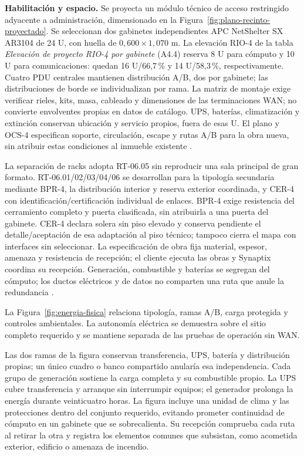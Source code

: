 \textbf{Habilitación y espacio.} Se proyecta un módulo técnico de acceso restringido adyacente a administración, dimensionado en la Figura~\ref{fig:plano-recinto-proyectado}. Se seleccionan dos gabinetes independientes APC NetShelter SX AR3104 de 24 U, con huella de $0,600\times1,070$ m. La elevación RIO-4 de la tabla \emph{Elevación de proyecto RIO-4 por gabinete} (A4.4) reserva 8 U para cómputo y 10 U para comunicaciones: quedan 16 U/66,7\,\% y 14 U/58,3\,\%, respectivamente. Cuatro PDU centrales mantienen distribución A/B, dos por gabinete; las distribuciones de borde se individualizan por rama. La matriz de montaje exige verificar rieles, kits, masa, cableado y dimensiones de las terminaciones WAN; no convierte envolventes propias en datos de catálogo. UPS, baterías, climatización y extinción conservan ubicación y servicio propios, fuera de esas U. El plano y OCS-4 especifican soporte, circulación, escape y rutas A/B para la obra nueva, sin atribuir estas condiciones al inmueble existente \parencite{p12-apc-ar3104}.





La separación de racks adopta RT-06.05 sin reproducir una sala principal de gran formato. RT-06.01/02/03/04/06 se desarrollan para la tipología secundaria mediante BPR-4, la distribución interior y reserva exterior coordinada, y CER-4 con identificación/certificación individual de enlaces. BPR-4 exige resistencia del cerramiento completo y puerta clasificada, sin atribuirla a una puerta del gabinete. CER-4 declara solera sin piso elevado y conserva pendiente el detalle/aceptación de esa adaptación al piso técnico; tampoco cierra el mapa con interfaces sin seleccionar. La especificación de obra fija material, espesor, amenaza y resistencia de recepción; el cliente ejecuta las obras y Synaptix coordina su recepción. Generación, combustible y baterías se segregan del cómputo; los ductos eléctricos y de datos no comparten una ruta que anule la redundancia \parencite[RT-06.01--06, pp.~14--15]{pucv-transversal}.

La Figura~\ref{fig:energia-fisica} relaciona tipología, ramas A/B, carga protegida y controles ambientales. La autonomía eléctrica se demuestra sobre el sitio completo requerido y se mantiene separada de las pruebas de operación sin WAN.



Las dos ramas de la figura conservan transferencia, UPS, batería y distribución propias; un único cuadro o banco compartido anularía esa independencia. Cada grupo de generación sostiene la carga completa y su combustible propio. La UPS cubre transferencia y arranque sin interrumpir equipos; el generador prolonga la energía durante veinticuatro horas. La figura incluye una unidad de clima y las protecciones dentro del conjunto requerido, evitando prometer continuidad de cómputo en un gabinete que se sobrecalienta. Su recepción comprueba cada ruta al retirar la otra y registra los elementos comunes que subsistan, como acometida exterior, edificio o amenaza de incendio.

